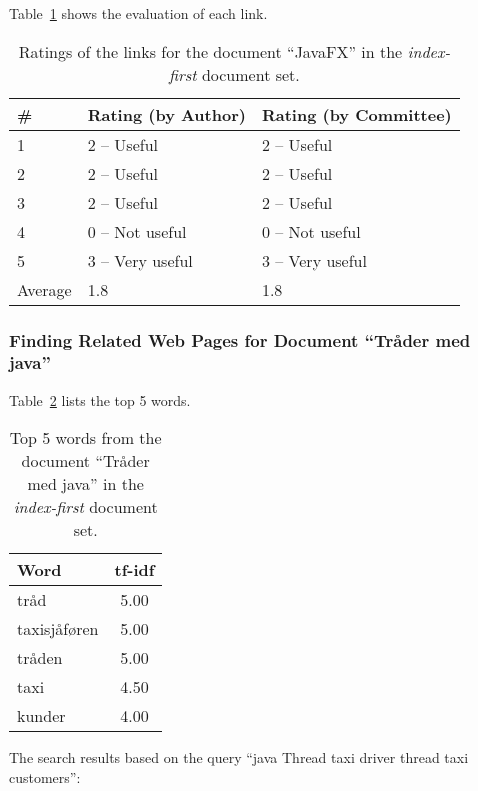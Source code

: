 Table~\ref{tab:ratings-no-javafx-2} shows the evaluation of each link.
\begin{table}[H]
\centering
\begin{tabular}{|l|l|l|}
\hline\hline
    \# & Rating (by Author) & Rating (by Committee) \\
\hline
    1 & 2 -- Useful & 2 -- Useful \\
    2 & 2 -- Useful & 2 -- Useful \\
    3 & 2 -- Useful & 2 -- Useful \\
    4 & 0 -- Not useful & 0 -- Not useful \\
    5 & 3 -- Very useful & 3 -- Very useful \\
\hline
    Average & 1.8 & 1.8 \\
\hline\hline
\end{tabular}
\caption{Ratings of the links for the document ``JavaFX'' in the \textit{index-first} document set.}
\label{tab:ratings-no-javafx-2}
\end{table}


\subsubsection{Finding Related Web Pages for Document ``Tråder med java''}
\label{subsubsec:no-tr-der-med-java-2}

Table~\ref{tab:topWords-no-tr-der-med-java-2} lists the top 5 words.
\begin{table}[H]
\centering
\begin{tabular}{|l|c|}
\hline\hline
    Word & tf-idf \\
\hline
    tråd & 5.00 \\
    taxisjåføren & 5.00 \\
    tråden & 5.00 \\
    taxi & 4.50 \\
    kunder & 4.00 \\
\hline\hline
\end{tabular}
\caption{Top 5 words from the document ``Tråder med java'' in the \textit{index-first} document set.}
\label{tab:topWords-no-tr-der-med-java-2}
\end{table}

The search results based on the query ``java Thread taxi driver thread taxi customers'':

